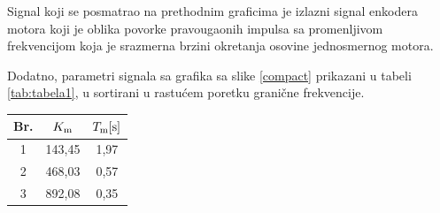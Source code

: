 \documentclass[a4paper, 12pt, diplomski]{etf}
\begin{document}
Signal koji se posmatrao na prethodnim graficima je izlazni signal enkodera motora koji je oblika povorke pravougaonih impulsa sa promenljivom frekvencijom koja je srazmerna brzini okretanja osovine jednosmernog motora.

Dodatno, parametri signala sa grafika sa slike \ref{compact} prikazani u tabeli \ref{tab:tabela1}, u sortirani u rastućem poretku granične frekvencije. \cite{oe} 
\cite{encArduino} 
\cite{curveFit}

\begin{center}
\begin{tabular}{||c |c|  c||} 
 \hline
 Br. & $K_{\rm m}$ & $T_{\rm m} [\rm s]$  \\ [0.5ex] 
 \hline\hline
 1 & 143,45 & 1,97  \\ [0.5ex]
 \hline
 2 & 468,03 & 0,57  \\ [0.5ex]
 \hline
 3 & 892,08 & 0,35  \\ [0.5ex] 
 \hline
\end{tabular}
\label{tab:tabela1}
\end{center}

\noindent
\end{document}
